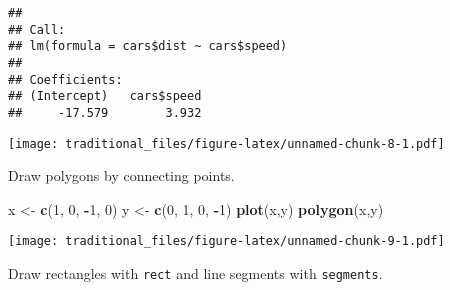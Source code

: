 \documentclass[]{article}
\newenvironment{Shaded}{\begin{snugshade}}{\end{snugshade}}
\newcommand{\KeywordTok}[1]{\textcolor[rgb]{0.13,0.29,0.53}{\textbf{#1}}}
\newcommand{\DataTypeTok}[1]{\textcolor[rgb]{0.13,0.29,0.53}{#1}}
\newcommand{\DecValTok}[1]{\textcolor[rgb]{0.00,0.00,0.81}{#1}}
\newcommand{\StringTok}[1]{\textcolor[rgb]{0.31,0.60,0.02}{#1}}
\newcommand{\OperatorTok}[1]{\textcolor[rgb]{0.81,0.36,0.00}{\textbf{#1}}}
\newcommand{\NormalTok}[1]{#1}
\begin{document}
\begin{verbatim}
## 
## Call:
## lm(formula = cars$dist ~ cars$speed)
## 
## Coefficients:
## (Intercept)   cars$speed  
##     -17.579        3.932
\end{verbatim}

\begin{Shaded}
\end{Shaded}

\texttt{[image: traditional\_files/figure-latex/unnamed-chunk-8-1.pdf]}

Draw polygons by connecting points.

\begin{Shaded}
\begin{Highlighting}[]
\NormalTok{x <-}\StringTok{ }\KeywordTok{c}\NormalTok{(}\DecValTok{1}\NormalTok{, }\DecValTok{0}\NormalTok{, }\OperatorTok{-}\DecValTok{1}\NormalTok{, }\DecValTok{0}\NormalTok{)}
\NormalTok{y <-}\StringTok{ }\KeywordTok{c}\NormalTok{(}\DecValTok{0}\NormalTok{, }\DecValTok{1}\NormalTok{, }\DecValTok{0}\NormalTok{, }\OperatorTok{-}\DecValTok{1}\NormalTok{)}
\KeywordTok{plot}\NormalTok{(x,y)}
\KeywordTok{polygon}\NormalTok{(x,y)}
\end{Highlighting}
\end{Shaded}

\texttt{[image: traditional\_files/figure-latex/unnamed-chunk-9-1.pdf]}

Draw rectangles with \texttt{rect} and line segments with
\texttt{segments}.
\end{document}
